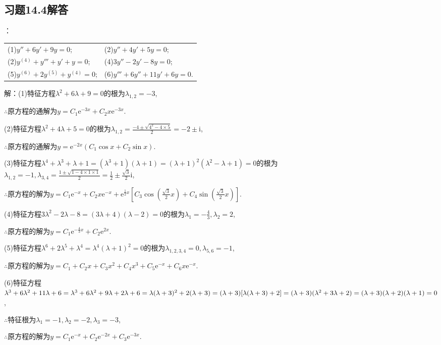 \documentclass[12pt,UTF8]{ctexart}
\newcommand{\me}[0]{\mathrm e}
\newcommand{\m}[0]{\mathrm }
\begin{document}
\subsection{习题14.4解答}
\begin{enumerate}
：\\
\begin{tabular}{ll}
(1)$y''+6y'+9y=0$;&(2)$y''+4y'+5y=0$;\\
(2)$y^{(4)}+y'''+y'+y=0$;&(4)$3y''-2y'-8y=0$;\\
(5)$y^{(6)}+2y^{(5)}+y^{(4)}=0$;&(6)$y'''+6y''+11y'+6y=0$.
\end{tabular}

解：(1)特征方程$\lambda^2+6\lambda+9=0$的根为$\lambda_{1,2}=-3$,

$\therefore$原方程的通解为$y=C_1\me^{-3x}+C_2x\me^{-3x}$.

(2)特征方程$\lambda^2+4\lambda+5=0$的根为$\lambda_{1,2}=\frac{-4\pm\sqrt{4^2-4\times5}}2=-2\pm\mathrm i$,

$\therefore$原方程的通解为$y=\me^{-2x}(C_1\cos x+C_2\sin x)$.

(3)特征方程$\lambda^4+\lambda^3+\lambda+1=(\lambda^3+1)(\lambda+1)=(\lambda+1)^2(\lambda^2-\lambda+1)=0$的根为\\
$\lambda_{1,2}=-1,\lambda_{3,4}=\frac{1\pm\sqrt{1-4\times1\times1}}2=\frac12\pm\frac{\sqrt 3}2\m i$,

$\therefore$原方程的解为$y=C_1\me^{-x}+C_2x\me^{-x}+\me^{\frac12x}[C_3\cos(\frac{\sqrt 3}2x)+C_4\sin(\frac{\sqrt 3}2x)]$.

(4)特征方程$3\lambda^2-2\lambda-8=(3\lambda+4)(\lambda-2)=0$的根为$\lambda_1=-\frac43,\lambda_2=2$,

$\therefore$原方程的解为$y=C_1\me^{-\frac43x}+C_2\me^{2x}$.

(5)特征方程$\lambda^6+2\lambda^5+\lambda^4=\lambda^4(\lambda+1)^2=0$的根为$\lambda_{1,2,3,4}=0,\lambda_{5,6}=-1$,

$\therefore$原方程的解为$y=C_1+C_2x+C_3x^2+C_4x^3+C_5\me^{-x}+C_6x\me^{-x}$.

(6)特征方程$\lambda^3+6\lambda^2+11\lambda+6=\lambda^3+6\lambda^2+9\lambda+2\lambda+6=\lambda(\lambda+3)^2+2(\lambda+3)\\
=(\lambda+3)[\lambda(\lambda+3)+2]=(\lambda+3)(\lambda^2+3\lambda+2)=(\lambda+3)(\lambda+2)(\lambda+1)=0$,

$\therefore$特征根为$\lambda_1=-1,\lambda_2=-2,\lambda_3=-3$,

$\therefore$原方程的解为$y=C_1\me^{-x}+C_2\me^{-2x}+C_3\me^{-3x}$.


\end{enumerate}
\end{document}
